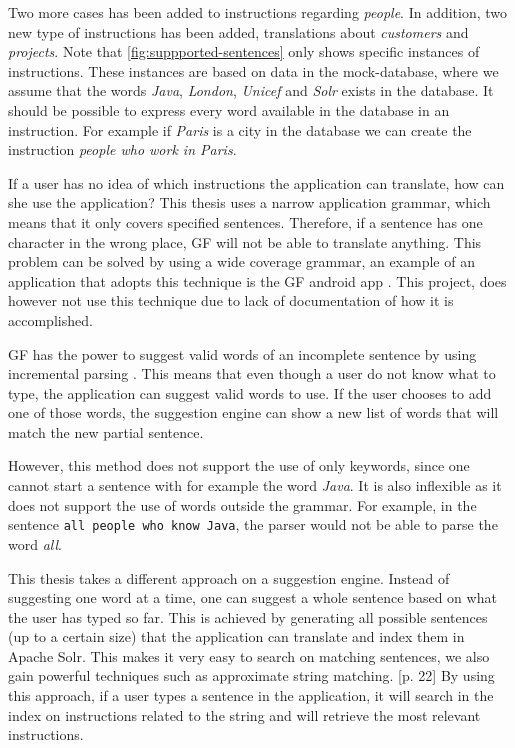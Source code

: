 Two more cases has been added to instructions regarding \emph{people}. In addition, two new type of instructions has been added, translations about \emph{customers} and \emph{projects}. Note that \autoref{fig:suppported-sentences} only shows specific instances of instructions. These instances are based on data in the mock-database, where we assume that the words \emph{Java}, \emph{London}, \emph{Unicef} and \emph{Solr} exists in the database. It should be possible to express every word available in the database in an instruction. For example if \emph{Paris} is a city in the database we can create the instruction \emph{people who work in Paris}.

If a user has no idea of which instructions the application can translate, how can she use the application? This thesis uses a narrow application grammar, which means that it only covers specified sentences. Therefore, if a sentence has one character in the wrong place, GF will not be able to
translate anything. This problem can be solved by using a wide coverage grammar, an example of an application that adopts this technique is the GF android app \cite[p. 41]{angelov2014speech}. This project, does however not use this technique due to lack of documentation of how it is accomplished.

GF has the power to suggest valid words of an incomplete sentence by using incremental parsing \cite{angelov09:incremental-parser}. This means that even though a user do not know what to type, the application can suggest valid words to use. If the user chooses to add one of those words, the suggestion engine can show a new list of words that will match the new partial sentence.

However, this method does not support the use of only keywords, since one cannot start a sentence with for example the word \emph{Java}. It is also inflexible as it does not support the use of words outside the grammar. For example, in the sentence \texttt{all people who know Java}, the parser would not be able to parse the word \emph{all}.

This thesis takes a different approach on a suggestion engine. Instead of suggesting one word at a time, one can suggest a whole sentence based on what the user has typed so far. This is achieved by generating all possible sentences (up to a certain size) that the application can translate and index them in Apache Solr. This makes it very easy to search on matching sentences, we also gain powerful techniques such as approximate string matching. \cite{bialecki:2012}[p. 22]
\newline
\newline
By using this approach, if a user types a sentence in the application, it will search in the index on instructions related to the string and will retrieve the most relevant instructions.

